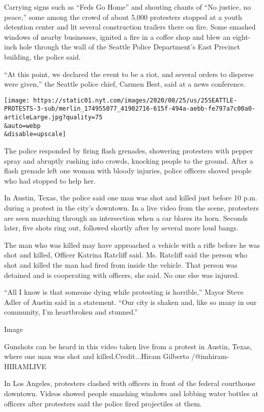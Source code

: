 Carrying signs such as ``Feds Go Home'' and shouting chants of ``No
justice, no peace,'' some among the crowd of about 5,000 protesters
stopped at a youth detention center and lit several construction
trailers there on fire. Some smashed windows of nearby businesses,
ignited a fire in a coffee shop and blew an eight-inch hole through the
wall of the Seattle Police Department's East Precinct building, the
police said.

``At this point, we declared the event to be a riot, and several orders
to disperse were given,'' the Seattle police chief, Carmen Best, said at
a news conference.

\texttt{[image: https://static01.nyt.com/images/2020/08/25/us/25SEATTLE-PROTESTS-3-sub/merlin\_174955077\_41902716-615f-494a-aebb-fe797a7c00a0-articleLarge.jpg?quality=75\\\&auto=webp\\\&disable=upscale]}

The police responded by firing flash grenades, showering protesters with
pepper spray and abruptly rushing into crowds, knocking people to the
ground. After a flash grenade left one woman with bloody injuries,
police officers shoved people who had stopped to help her.

In Austin, Texas, the police said one man was shot and killed just
before 10 p.m. during a protest in the city's downtown. In a live video
from the scene, protesters are seen marching through an intersection
when a car blares its horn. Seconds later, five shots ring out, followed
shortly after by several more loud bangs.

The man who was killed may have approached a vehicle with a rifle before
he was shot and killed, Officer Katrina Ratcliff said. Ms. Ratcliff said
the person who shot and killed the man had fired from inside the
vehicle. That person was detained and is cooperating with officers, she
said. No one else was injured.

``All I know is that someone dying while protesting is horrible,'' Mayor
Steve Adler of Austin said in a statement. ``Our city is shaken and,
like so many in our community, I'm heartbroken and stunned.''

Image

Gunshots can be heard in this video taken live from a protest in Austin,
Texas, where one man was shot and killed.Credit...Hiram Gilberto
/@imhiram-HIRAMLIVE

In Los Angeles, protesters clashed with officers in front of the federal
courthouse downtown. Videos showed people smashing windows and lobbing
water bottles at officers after protesters said the police fired
projectiles at them.

